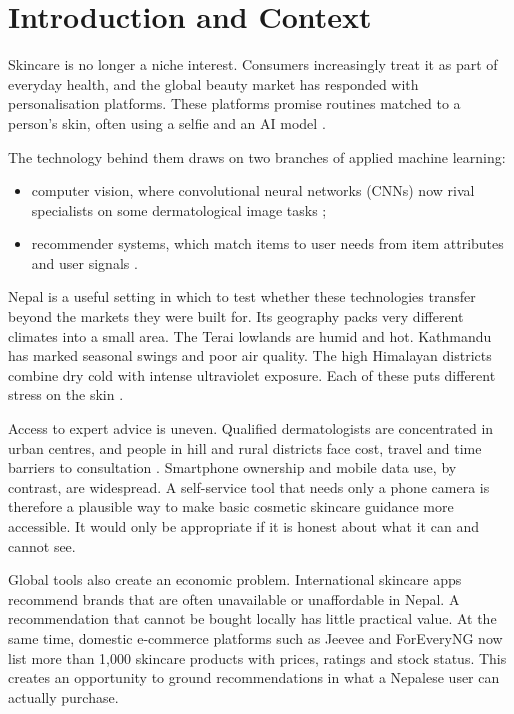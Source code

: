 \section{Introduction and Context}
\label{sec:intro}

Skincare is no longer a niche interest. Consumers increasingly treat it as part of everyday health, and the global beauty market has responded with personalisation platforms. These platforms promise routines matched to a person's skin, often using a selfie and an AI model \citep{ramrakhiani2024}.

The technology behind them draws on two branches of applied machine learning:
\begin{itemize}
  \item computer vision, where convolutional neural networks (CNNs) now rival specialists on some dermatological image tasks \citep{liu2020,jones2022};
  \item recommender systems, which match items to user needs from item attributes and user signals \citep{ricci2022}.
\end{itemize}

Nepal is a useful setting in which to test whether these technologies transfer beyond the markets they were built for. Its geography packs very different climates into a small area. The Terai lowlands are humid and hot. Kathmandu has marked seasonal swings and poor air quality. The high Himalayan districts combine dry cold with intense ultraviolet exposure. Each of these puts different stress on the skin \citep{goldust2024}.

Access to expert advice is uneven. Qualified dermatologists are concentrated in urban centres, and people in hill and rural districts face cost, travel and time barriers to consultation \citep{paudel2020}. Smartphone ownership and mobile data use, by contrast, are widespread. A self-service tool that needs only a phone camera is therefore a plausible way to make basic cosmetic skincare guidance more accessible. It would only be appropriate if it is honest about what it can and cannot see.

Global tools also create an economic problem. International skincare apps recommend brands that are often unavailable or unaffordable in Nepal. A recommendation that cannot be bought locally has little practical value. At the same time, domestic e-commerce platforms such as Jeevee and ForEveryNG now list more than 1,000 skincare products with prices, ratings and stock status. This creates an opportunity to ground recommendations in what a Nepalese user can actually purchase.

